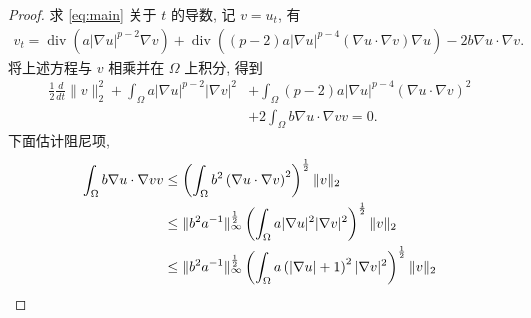 \documentclass[twoside,longtitle]{LZUthesis}
\theoremstyle{definition}
\newtheorem{proofpart}{part}
\numberwithin{equation}{chapter}
\newcommand*\abs[1]{\lvert#1\rvert}
\newcommand*\norm[1]{\lVert#1\rVert}
\newcommand*\Brace[1]{\lbrace#1\rbrace}
\newcommand\R{\mathbb{R}}
\DeclareMathOperator{\Div}{div}
\begin{document}
\begin{proof}
	求 \cref{eq:main} 关于 $t$ 的导数, 记 $v = u_t$, 有
	\begin{equation}
		\begin{split}
			v_t
			= \Div\left(a\abs{\nabla u}^{p-2}\nabla v\right)
			+ \Div\left(\left(p-2\right)a \abs{\nabla u}^{p-4}\left(\nabla u \cdot \nabla v\right)\nabla u\right)
			- 2b\nabla u \cdot \nabla v.
		\end{split}
	\end{equation}
	将上述方程与 $v$ 相乘并在 $\Omega$ 上积分, 得到
	\begin{equation}
		\begin{split}
			\frac{1}{2}\frac{d}{dt}\norm{v}_2^2
			+ \int_{\Omega}a\abs{\nabla u}^{p-2}\abs{\nabla v}^2
			&+ \int_{\Omega}\left(p-2\right)a\abs{\nabla u}^{p-4}\left(\nabla u
			\cdot \nabla v\right)^2\\
			&+ 2\int_{\Omega}b\nabla u \cdot \nabla v v
			= 0.
		\end{split}
	\end{equation}
	下面估计阻尼项,
	\begin{equation}
		\begin{split}
			\int_{\Omega}b\nabla u \cdot \nabla v v
			&\leq \left(\int_{\Omega}b^2\left(\nabla u
			\cdot \nabla v\right)^2\right)^{\frac{1}{2}}
			\*\norm{v}_2\\
			&\leq \norm{b^2 a^{-1}}_{\infty}^{\frac{1}{2}}
			\left(\int_{\Omega}a\abs{\nabla u}^2\abs{\nabla v}^2\right)^{\frac{1}{2}}\norm{v}_2\\
			&\leq \norm{b^2 a^{-1}}_{\infty}^{\frac{1}{2}}
			\left(\int_{\Omega}a\left(\abs{\nabla u}+1\right)^2\abs{\nabla v}^2\right)^{\frac{1}{2}}\norm{v}_2\\

\end{split}
\end{equation}
\end{proof}
\end{document}
